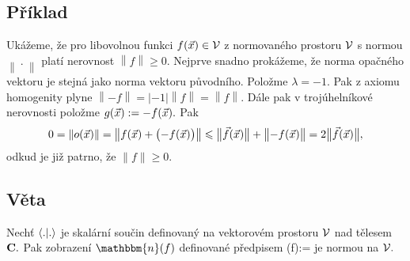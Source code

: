 \subsection{P\v r\'iklad}

Uk\'a\v zeme, \v ze pro libovolnou funkci $f({\vec{x}})\in {\mathcal V}$ z
normovan\'eho prostoru ${\mathcal V}$ s normou $\left\|~.~\right\|$ plat\'i
nerovnost $\left\|f\right\|\geq 0.$ Nejprve snadno prok\'a\v
zeme, \v ze norma opa\v cn\'eho vektoru je stejn\'a jako norma
vektoru p\r uvodn\'iho. Polo\v zme $\lambda=-1.$ Pak z axiomu
homogenity plyne $\left\|-f\right\|= \left|-1\right| \left\|f\right\|=\left\|f\right\|.$ D\'ale pak v troj\'uheln\'ikov\'e nerovnosti polo\v zme $g({\vec{x}}):=-f({\vec{x}}).$ Pak $$0=\|o({\vec{x}})\|=\left\|f({\vec{x}})+\bigl(-f({\vec{x}})\bigr)\right\| \leqslant \bigl\|{\vec{f}}({\vec{x}})\bigr\|+\bigl\|-f({\vec{x}})\bigr\|=2\bigl\|{\vec{f}}({\vec{x}})\bigr\|,$$ odkud je ji\v z patrno, \v ze $\|f\|\geq 0.$


\subsection{V\v eta}
Nech\v t $\langle . | . \rangle$ je skal\'arn\'i sou\v cin definovan\'y na
vektorov\'em prostoru ${\mathcal V}$ nad t\v elesem ${\mathbf C}.$ Pak zobrazen\'i
$\mathbbm{n}(f)$ definovan\'e p\v redpisem
%
\BE {}(f):= \label{ngss} \EE
%
je normou na ${\mathcal V}.$\\

\Proof


